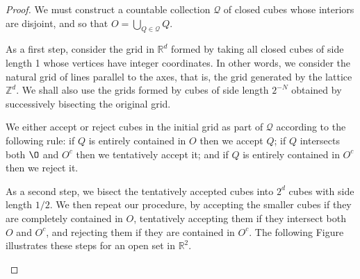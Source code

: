 \documentclass[UTF8,12pt,AutoFakeBold]{ctexbook}
\numberwithin{equation}{section}
\begin{document}
	\begin{proof}
		 We must construct a countable collection $\mathcal{Q}$ of closed cubes whose interiors are disjoint, and so that $O=\bigcup_{Q \in \mathcal{Q}} Q$.
		
		As a first step, consider the grid in $\mathbb{R}^d$ formed by taking all closed cubes of side length 1 whose vertices have integer coordinates. In other words, we consider the natural grid of lines parallel to the axes, that is, the grid generated by the lattice $\mathbb{Z}^d$. We shall also use the grids formed by cubes of side length $2^{-N}$ obtained by successively bisecting the original grid.
		
		We either accept or reject cubes in the initial grid as part of $\mathcal{Q}$ according to the following rule: if $Q$ is entirely contained in $O$ then we accept $Q$; if $Q$ intersects both $\O$ and $O^c$ then we tentatively accept it; and if $Q$ is entirely contained in $O^c$ then we reject it.
		
		As a second step, we bisect the tentatively accepted cubes into $2^d$ cubes with side length $1 / 2$. We then repeat our procedure, by accepting the smaller cubes if they are completely contained in $O$, tentatively accepting them if they intersect both $O$ and $O^c$, and rejecting them if they are contained in $O^c$. The following Figure illustrates these steps for an open set in $\mathbb{R}^2$.
		
		\begin{multicols}{2}
			\begin{figure}[H]
				\centering
				
				\begin{tikzpicture}[x=0.75pt,y=0.75pt,yscale=-1,xscale=1]
					

\end{tikzpicture}
\end{figure}
\end{multicols}
\end{proof}
\end{document}
